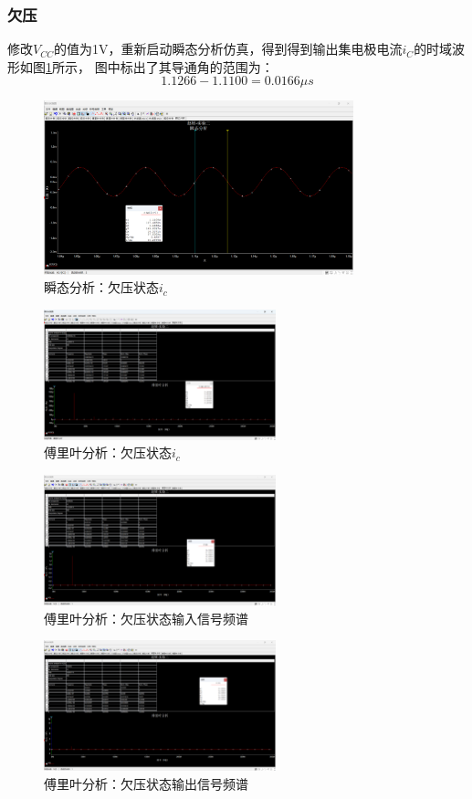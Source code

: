 \documentclass[UTF8]{ctexart}
\begin{document}
\subsubsection{欠压}
修改$V_{CC}$的值为1V，重新启动瞬态分析仿真，得到得到输出集电极电流$i_C$的时域波形如图\ref{img:14}所示，
图中标出了其导通角的范围为：
$$
1.1266-1.1100=0.0166\mu s
$$
\begin{figure}[htbp]
    \centering
    \includegraphics[width=0.8\textwidth]{14.png}
    \caption{瞬态分析：欠压状态$i_c$}
    \label{img:14}
\end{figure}
\begin{figure}[htbp]
    \centering
    \includegraphics[width=0.6\textwidth]{15.png}
    \caption{傅里叶分析：欠压状态$i_c$}
    \label{img:15}
\end{figure}
\begin{figure}[htbp]
    \centering
    \includegraphics[width=0.6\textwidth]{16.png}
    \caption{傅里叶分析：欠压状态输入信号频谱}
    \label{img:16}
\end{figure}
\begin{figure}[htbp]
    \centering
    \includegraphics[width=0.6\textwidth]{17.png}
    \caption{傅里叶分析：欠压状态输出信号频谱}
    \label{img:17}
\end{figure}
\end{document}
